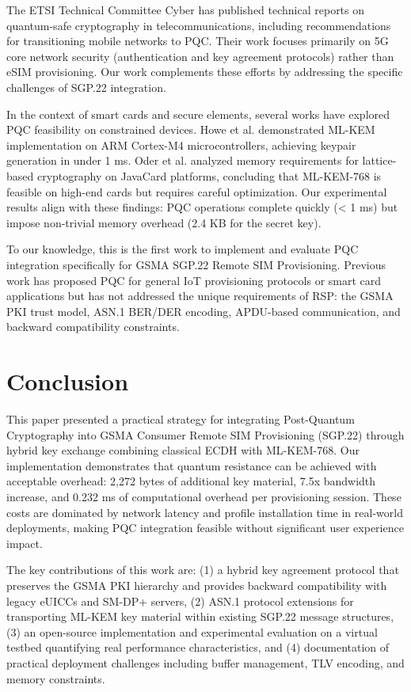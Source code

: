 \documentclass{easychair}
\begin{document}
The ETSI Technical Committee Cyber has published technical reports on quantum-safe cryptography in telecommunications, including recommendations for transitioning mobile networks to PQC. Their work focuses primarily on 5G core network security (authentication and key agreement protocols) rather than eSIM provisioning. Our work complements these efforts by addressing the specific challenges of SGP.22 integration.

In the context of smart cards and secure elements, several works have explored PQC feasibility on constrained devices. Howe et al. demonstrated ML-KEM implementation on ARM Cortex-M4 microcontrollers, achieving keypair generation in under 1 ms. Oder et al. analyzed memory requirements for lattice-based cryptography on JavaCard platforms, concluding that ML-KEM-768 is feasible on high-end cards but requires careful optimization. Our experimental results align with these findings: PQC operations complete quickly (< 1 ms) but impose non-trivial memory overhead (2.4 KB for the secret key).

To our knowledge, this is the first work to implement and evaluate PQC integration specifically for GSMA SGP.22 Remote SIM Provisioning. Previous work has proposed PQC for general IoT provisioning protocols or smart card applications but has not addressed the unique requirements of RSP: the GSMA PKI trust model, ASN.1 BER/DER encoding, APDU-based communication, and backward compatibility constraints.

\section{Conclusion}

This paper presented a practical strategy for integrating Post-Quantum Cryptography into GSMA Consumer Remote SIM Provisioning (SGP.22) through hybrid key exchange combining classical ECDH with ML-KEM-768. Our implementation demonstrates that quantum resistance can be achieved with acceptable overhead: 2,272 bytes of additional key material, 7.5x bandwidth increase, and 0.232 ms of computational overhead per provisioning session. These costs are dominated by network latency and profile installation time in real-world deployments, making PQC integration feasible without significant user experience impact.

The key contributions of this work are: (1) a hybrid key agreement protocol that preserves the GSMA PKI hierarchy and provides backward compatibility with legacy eUICCs and SM-DP+ servers, (2) ASN.1 protocol extensions for transporting ML-KEM key material within existing SGP.22 message structures, (3) an open-source implementation and experimental evaluation on a virtual testbed quantifying real performance characteristics, and (4) documentation of practical deployment challenges including buffer management, TLV encoding, and memory constraints.
\end{document}
